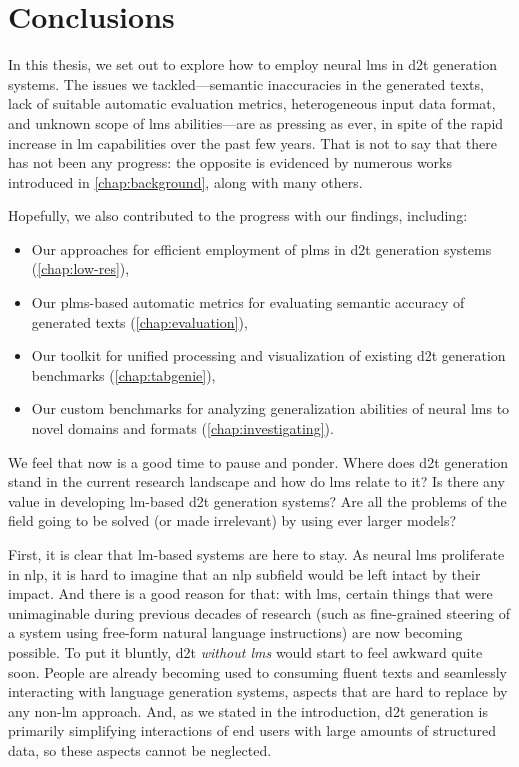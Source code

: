 
\chapter{Conclusions}
\label{chap:conclusions}

In this thesis, we set out to explore how to employ neural \acp{lm} in \ac{d2t} generation systems. The issues we tackled---semantic inaccuracies in the generated texts, lack of suitable automatic evaluation metrics, heterogeneous input data format, and unknown scope of \acp{lm} abilities---are as pressing as ever, in spite of the rapid increase in \ac{lm} capabilities over the past few years. That is not to say that there has not been any progress: the opposite is evidenced by numerous works introduced in \autoref{chap:background}, along with many others.


Hopefully, we also contributed to the progress with our findings, including:
\begin{itemize}
    \item Our approaches for efficient employment of \acp{plm} in \ac{d2t} generation systems (\autoref{chap:low-res}),
    \item Our \acp{plm}-based automatic metrics for evaluating semantic accuracy of generated texts (\autoref{chap:evaluation}),
    \item Our toolkit for unified processing and visualization of existing \ac{d2t} generation benchmarks (\autoref{chap:tabgenie}),
    \item Our custom benchmarks for analyzing generalization abilities of neural \acp{lm} to novel domains and formats (\autoref{chap:investigating}).
\end{itemize}

We feel that now is a good time to pause and ponder. Where does \ac{d2t} generation stand in the current research landscape and how do \acp{lm} relate to it? Is there any value in developing \ac{lm}-based \ac{d2t} generation systems? Are all the problems of the field going to be solved (or made irrelevant) by using ever larger models?


First, it is clear that \ac{lm}-based systems are here to stay. As neural \acp{lm} proliferate in \ac{nlp}, it is hard to imagine that an \ac{nlp} subfield would be left intact by their impact. And there is a good reason for that: with \acp{lm}, certain things that were unimaginable during previous decades of research (such as fine-grained steering of a system using free-form natural language instructions) are now becoming possible. To put it bluntly, \ac{d2t} \emph{without \acp{lm}} would start to feel awkward quite soon. People are already becoming used to consuming fluent texts and seamlessly interacting with language generation systems, aspects that are hard to replace by any non-\ac{lm} approach. And, as we stated in the introduction, \ac{d2t} generation is primarily simplifying interactions of end users with large amounts of structured data, so these aspects cannot be neglected.

